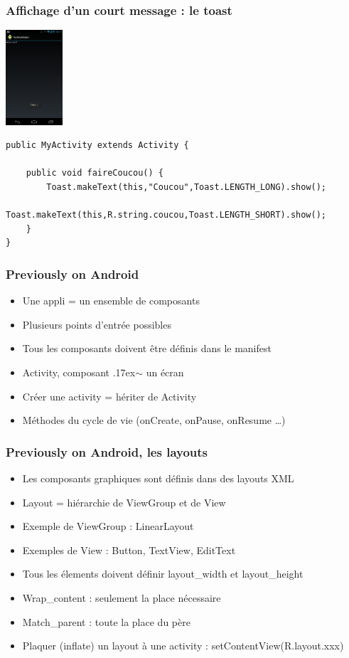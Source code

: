 \documentclass{beamer}
\begin{document}
\begin{frame}[fragile]
\frametitle{Affichage d'un court message : le toast}
\includegraphics[width=60pt]{img/coucou.png}
\begin{lstlisting}
public MyActivity extends Activity {
    
    public void faireCoucou() {
        Toast.makeText(this,"Coucou",Toast.LENGTH_LONG).show();
        Toast.makeText(this,R.string.coucou,Toast.LENGTH_SHORT).show();
    }	
}
\end{lstlisting}
\end{frame}
\begin{frame}[fragile] 
\frametitle{Previously on Android}
\begin{itemize}
  \item Une appli = un ensemble de composants
  \item Plusieurs points d'entrée possibles
  \item Tous les composants doivent être définis dans le manifest
  \item Activity, composant {\raise.17ex\hbox{$\scriptstyle\sim$}} un écran
  \item Créer une activity = hériter de Activity
  \item Méthodes du cycle de vie (onCreate, onPause, onResume \ldots)
\end{itemize}
\end{frame}
\begin{frame}[fragile] 
\frametitle{Previously on Android, les layouts}
\begin{itemize}
  \item Les composants graphiques sont définis dans des layouts XML
  \item Layout = hiérarchie de ViewGroup et de View
  \item Exemple de ViewGroup : LinearLayout
  \item Exemples de View : Button, TextView, EditText
  \item Tous les élements doivent définir layout\_width et layout\_height
  \item Wrap\_content : seulement la place nécessaire
  \item Match\_parent : toute la place du père
  \item Plaquer (inflate) un layout à une activity :
  setContentView(R.layout.xxx)
\end{itemize}
\end{frame}
\end{document}
